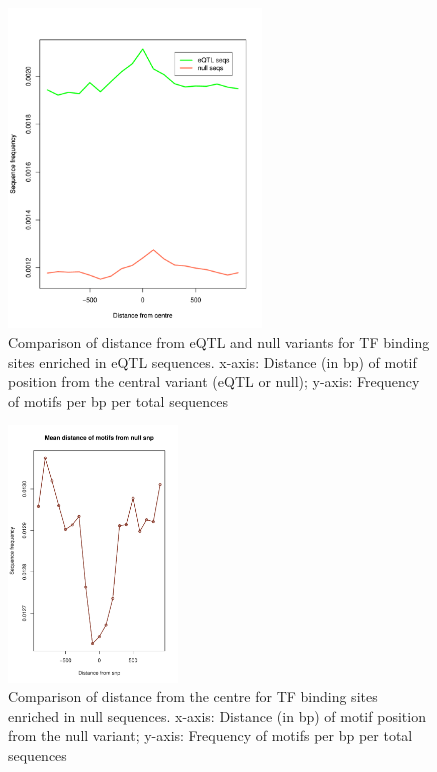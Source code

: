 \documentclass[12pt]{article}
\begin{document}
\begin{figure}[!htbp]
\centering
\includegraphics[width= 0.6\textwidth]{RplotEQTLandNullSequencesCompared.pdf} 
\caption{Comparison of distance from eQTL and null variants for TF binding sites enriched in eQTL sequences. x-axis: Distance (in bp) of motif position from the central variant (eQTL or null); y-axis: Frequency of motifs per bp per total sequences}
\label{distance}
\end{figure}

\begin{figure}[!htbp]
\centering
\includegraphics[width= 0.4\textwidth]{NullMotifsPlot.pdf} 
\caption{Comparison of distance from the centre for TF binding sites enriched in null sequences. x-axis: Distance (in bp) of motif position from the null variant; y-axis: Frequency of motifs per bp per total sequences}
\label{nullDistance}
\end{figure}
\end{document}
